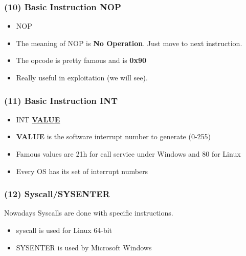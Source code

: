 \documentclass[]{beamer}
\begin{document}
\begin{frame}
  \frametitle{(10) Basic Instruction NOP}
  \begin{itemize}
  \item{NOP}\\
  \item{The meaning of NOP is \textbf{No Operation}. Just move to next instruction.}
  \item{The opcode is pretty famous and is \textbf{0x90}}
  \item{Really useful in exploitation (we will see).}
  \end{itemize}
\end{frame}


\begin{frame}
  \frametitle{(11) Basic Instruction INT}
  \begin{itemize}
  \item{INT \underline{\textbf{VALUE}}}\\
  \item{\textbf{VALUE} is the software interrupt number to generate (0-255)}
  \item{Famous values are 21h for call service under Windows and 80 for Linux}
  \item{Every OS has its set of interrupt numbers}
  \end{itemize}
\end{frame}


\begin{frame}
  \frametitle{(12) Syscall/SYSENTER}
  Nowadays Syscalls are done with specific instructions.
  \begin{itemize}
  \item{syscall is used for Linux 64-bit}
  \item{SYSENTER is used by Microsoft Windows}
  \end{itemize}
\end{frame}
\end{document}
